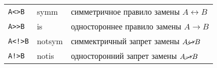 \noindent\begin{tabular}{l l l}
\verb|A<>B| & symm & симметричное правило замены $A\leftrightarrow B$\\
\verb|A>>B| & is & одностороннее правило замены $A\rightarrow B$\\
\verb|A<!>B| & notsym & симмектричный запрет замены $A\cancel\leftrightarrow
B$\\
\verb|A!>B| & notis & односторонний запрет замены $A\cancel\rightarrow B$\\
\end{tabular}

\secup




